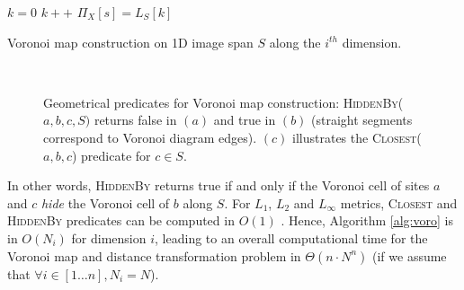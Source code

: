 \documentclass{llncs}
\begin{document}
\begin{algorithm}[H]\footnotesize
{ $k=0$\;
}
  {
          {
            $k++$\;
          }
    $\Pi_X[s] = L_S[k]$\;
  }

  \caption{Voronoi map construction on 1D image span $S$ along the
    $i^{th}$ dimension.\label{alg:voro}}
\end{algorithm}
\begin{figure}
  \begin{center}
    ~~~~~~~~~~
  \end{center}
  \caption{\small Geometrical predicates for Voronoi map construction:
    \textsc{HiddenBy}($a,b,c,S)$ returns false in $(a)$ and true in
    $(b)$ (straight segments correspond to Voronoi diagram
    edges). $(c)$ illustrates the \textsc{Closest}($a,b,c$) predicate
    for $c\in S$.}
  \label{fig:predicates}
\end{figure}


In other words, \textsc{HiddenBy} returns true if and only if the
Voronoi cell of sites $a$ and $c$ \emph{hide} the Voronoi cell of $b$
along $S$.  For $L_1$, $L_2$ and $L_\infty$ metrics,
\textsc{Closest} and \textsc{HiddenBy} predicates can be computed in
$O(1)$ \cite{BreuEtAl95,Hirata,roerdnik}. Hence, Algorithm
\ref{alg:voro} is in $O(N_i)$ for dimension $i$, leading to an overall
computational time for the Voronoi map and distance transformation
problem in $\Theta(n\cdot N^n)$ (if we assume that $\forall i\in[1\ldots
  n], N_i=N$).
\end{document}

